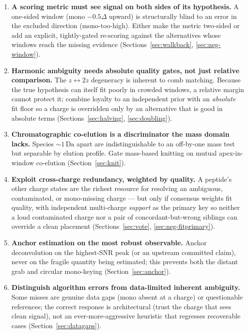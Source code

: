 \documentclass[11pt]{article}
\newcommand{\Da}{\,\text{Da}}
\begin{document}
\begin{enumerate}[leftmargin=1.6em,label=\textbf{\arabic*.}]
  \item \textbf{A scoring metric must see signal on both sides of its hypothesis.} A one-sided
  window (mono $-0.5\Delta$ upward) is structurally blind to an error in the excluded direction
  (mono-too-high). Either make the metric two-sided or add an explicit, tightly-gated re-scoring
  against the alternatives whose windows reach the missing evidence (Sections~\ref{sec:walkback},
  \ref{sec:neg-window}).
  \item \textbf{Harmonic ambiguity needs absolute quality gates, not just relative comparison.}
  The $z \leftrightarrow 2z$ degeneracy is inherent to comb matching. Because the true hypothesis can
  itself fit poorly in crowded windows, a relative margin cannot protect it; combine loyalty to an
  independent prior with an \emph{absolute} fit floor so a charge is overridden only by an
  alternative that is good in absolute terms (Sections~\ref{sec:halving}, \ref{sec:doubling}).
  \item \textbf{Chromatographic co-elution is a discriminator the mass domain lacks.} Species
  $\sim 1\Da$ apart are indistinguishable to an off-by-one mass test but separable by elution
  profile. Gate mass-based knitting on mutual apex-in-window co-elution (Section~\ref{sec:knit}).
  \item \textbf{Exploit cross-charge redundancy, weighted by quality.} A peptide's other charge
  states are the richest resource for resolving an ambiguous, contaminated, or mono-missing charge
  --- but only if consensus weights fit quality, with independent multi-charge \emph{support} as the
  primary key so neither a loud contaminated charge nor a pair of concordant-but-wrong siblings can
  override a clean placement (Sections~\ref{sec:vote}, \ref{sec:neg-fitprimary}).
  \item \textbf{Anchor estimation on the most robust observable.} Anchor deconvolution on the
  highest-SNR peak (or an upstream committed claim), never on the fragile quantity being estimated;
  this prevents both the distant grab and circular mono-keying (Section~\ref{sec:anchor}).
  \item \textbf{Distinguish algorithm errors from data-limited inherent ambiguity.} Some misses are
  genuine data gaps (mono absent at a charge) or questionable references; the correct response is
  architectural (trust the charge that sees clean signal), not an ever-more-aggressive heuristic that
  regresses recoverable cases (Section~\ref{sec:datagaps}).

\end{enumerate}
\end{document}
